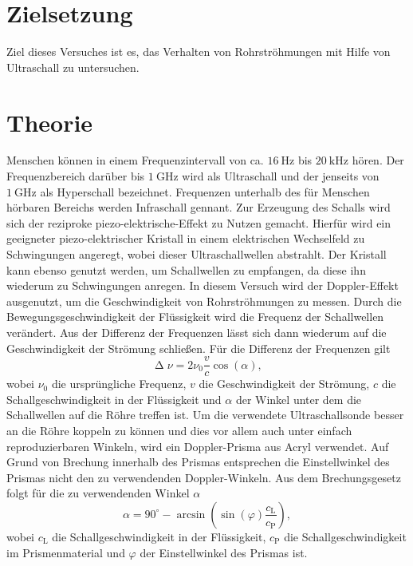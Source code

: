 \section{Zielsetzung}
\label{sec:Zielsetzung}

Ziel dieses Versuches ist es, das Verhalten von Rohrströhmungen mit Hilfe von Ultraschall zu untersuchen.

\section{Theorie}
\label{sec:Theorie}

Menschen können in einem Frequenzintervall von ca. $\SI{16}{\hertz}$ bis $\SI{20}{\kilo\hertz}$ hören. Der Frequenzbereich darüber bis $\SI{1}{\giga\hertz}$ wird als
Ultraschall und der jenseits von $\SI{1}{\giga\hertz}$ als Hyperschall bezeichnet. Frequenzen unterhalb des für Menschen hörbaren Bereichs werden Infraschall gennant.
\newline
Zur Erzeugung des Schalls wird sich der reziproke piezo-elektrische-Effekt zu Nutzen gemacht. Hierfür wird ein geeigneter piezo-elektrischer Kristall in einem
elektrischen Wechselfeld zu Schwingungen angeregt, wobei dieser Ultraschallwellen abstrahlt. Der Kristall kann ebenso genutzt werden, um Schallwellen zu empfangen,
da diese ihn wiederum zu Schwingungen anregen.
\newline
In diesem Versuch wird der Doppler-Effekt ausgenutzt, um die Geschwindigkeit von Rohrströhmungen zu messen. Durch die Bewegungsgeschwindigkeit der Flüssigkeit wird
die Frequenz der Schallwellen verändert. Aus der Differenz der Frequenzen lässt sich dann wiederum auf die Geschwindigkeit der Strömung schließen.
Für die Differenz der Frequenzen gilt
\begin{equation}
    \upDelta \nu = 2\nu_0 \frac{v}{c} \cos(\alpha),
    \label{eqn:df}
\end{equation}
\noindent
wobei $\nu_0$ die ursprüngliche Frequenz, $v$ die Geschwindigkeit der Strömung, $c$ die Schallgeschwindigkeit in der Flüssigkeit und $\alpha$ der Winkel unter dem die
Schallwellen auf die Röhre treffen ist.
\newline\newline
Um die verwendete Ultraschallsonde besser an die Röhre koppeln zu können und dies vor allem auch unter einfach reproduzierbaren Winkeln, wird ein Doppler-Prisma aus
Acryl verwendet. Auf Grund von Brechung innerhalb des Prismas entsprechen die Einstellwinkel des Prismas nicht den zu verwendenden Doppler-Winkeln. Aus dem
Brechungsgesetz folgt für die zu verwendenden Winkel $\alpha$
\begin{equation}
    \alpha = 90^\circ - \arcsin(\sin(\varphi)\frac{c_\text{L}}{c_\text{P}}),
    \label{eqn:alpha}
\end{equation}
\noindent
wobei $c_\text{L}$ die Schallgeschwindigkeit in der Flüssigkeit, $c_\text{P}$ die Schallgeschwindigkeit im Prismenmaterial und $\varphi$ der Einstellwinkel des Prismas ist.

\cite{AnleitungUS3}
